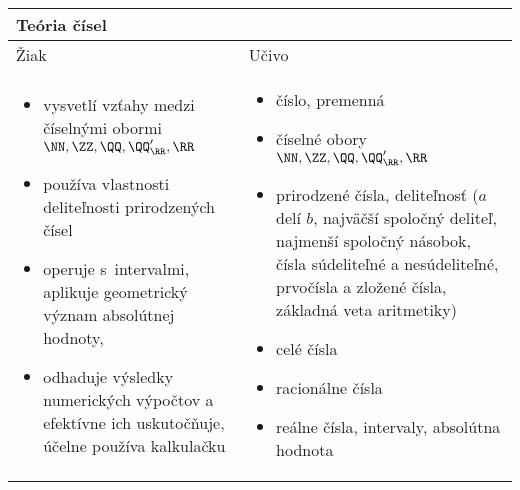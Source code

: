 \noindent \begin{tabularx}{\textwidth} { XX }
  \toprule
\multicolumn{2}{p{\textwidth}}{Teória čísel} \\ \midrule
  Žiak & Učivo\\
  \begin{itemize}
    \item vysvetlí vzťahy medzi číselnými obormi $\NN, \ZZ, \QQ, \QQ'_{\RR}, \RR$
    \item používa vlastnosti deliteľnosti prirodzených čísel
    \item operuje s~intervalmi, aplikuje geometrický význam absolútnej hodnoty,
    \item odhaduje výsledky numerických výpočtov a efektívne ich uskutočňuje, účelne používa kalkulačku
  \end{itemize} &
  \begin{itemize}
    \item číslo, premenná
    \item číselné obory $\NN, \ZZ, \QQ, \QQ'_{\RR}, \RR$
    \item prirodzené čísla, deliteľnosť ($a$ delí $b$, najväčší spoločný deliteľ, najmenší spoločný násobok, čísla súdeliteľné a nesúdeliteľné, prvočísla a zložené čísla, základná veta aritmetiky)
    \item celé čísla
    \item racionálne čísla
    \item reálne čísla, intervaly, absolútna hodnota
  \end{itemize}\\ \midrule
\end{tabularx}

